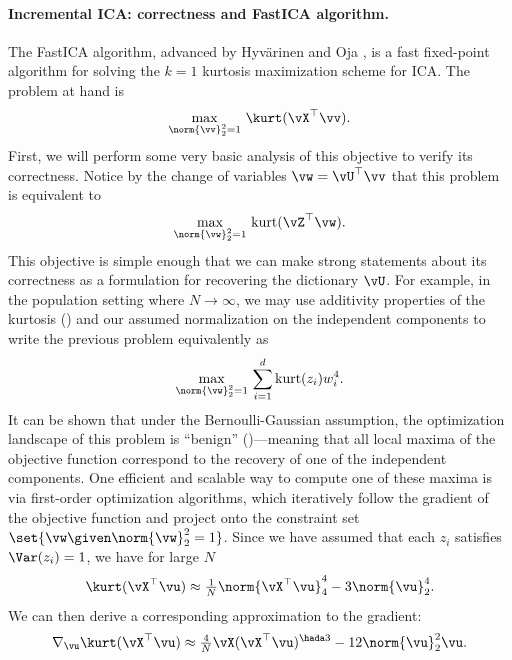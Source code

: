 \documentclass[../../book-main.tex]{subfiles}
\begin{document}
\paragraph{Incremental ICA: correctness and FastICA algorithm.}
The FastICA algorithm, advanced by Hyv\"{a}rinen and Oja \cite{hyvarinen-1997}, is a fast fixed-point algorithm for solving the $k=1$ kurtosis maximization scheme for ICA.
The problem at hand is
\begin{equation}\label{eq:kurtosis-maximization-sphere-finitesample}
    \max_{\norm{\vv}_2^2 = 1}\, \kurt(\vX^\top \vv).
\end{equation}
First, we will perform some very basic analysis of this objective to verify its correctness. Notice by the change of variables $\vw = \vU^\top \vv$ that this problem is equivalent to
\begin{equation*}
    \max_{\norm{\vw}_2^2 = 1}\, 
    \mathrm{kurt}(\vZ^\top \vw).
\end{equation*}
This objective is simple enough that we can make strong statements about its correctness as a formulation for recovering the dictionary $\vU$.
For example, in the population setting where $N \to \infty$, 
we may use additivity properties of the kurtosis () and our assumed normalization on the independent components to write the previous problem equivalently as
\begin{equation}\label{eq:kurtosis-maximization-sphere-population-simple}
    \max_{\norm{\vw}_2^2 = 1}\, 
    \sum_{i=1}^d \mathrm{kurt}(z_i) w_i^4.
\end{equation}
It can be shown that under the Bernoulli-Gaussian assumption, the optimization landscape of this problem is ``benign'' ()---meaning that all local maxima of the objective function correspond to the recovery of one of the independent components.
One efficient and scalable way to compute one of these maxima is via first-order optimization algorithms, which iteratively follow the gradient of the objective function and project onto the constraint set $\set{\vw \given \norm{\vw}_2^2 = 1}$.
Since we have assumed that each $z_i$ satisfies $\Var(z_i)=1$, we 
have for large $N$
\begin{equation}\label{eq:kurtosis-approximation-l4}
    \kurt(\vX^\top \vu)
    \approx
    \tfrac{1}{N} \norm{\vX^\top \vu}_4^4 - 3 \norm{\vu}_2^4.
\end{equation}
We can then derive a corresponding approximation to the gradient:
\begin{equation*}
    \nabla_{\vu} \kurt(\vX^\top \vu)
    \approx
    \tfrac{4}{N} \vX (\vX^\top \vu)^{\hada 3}
    - 12 \norm{\vu}_2^2 \vu.
\end{equation*}
\end{document}
